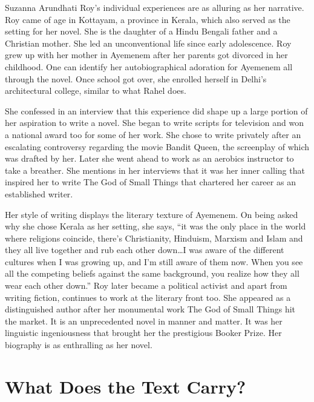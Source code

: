 Suzanna Arundhati Roy’s individual experiences are as alluring as her narrative. Roy came of age in Kottayam, a province in Kerala, which also served as the setting for her novel. She is the daughter of a Hindu Bengali father and a Christian mother. She led an unconventional life since early adolescence. Roy grew up with her mother in Ayemenem after her parents got divorced in her childhood. One can identify her autobiographical adoration for Ayemenem all through the novel. Once school got over, she enrolled herself in Delhi’s architectural college, similar to what Rahel does.

She confessed in an interview that this experience did shape up a large portion of her aspiration to write a novel. She began to write scripts for television and won a national award too for some of her work. She chose to write privately after an escalating controversy regarding the movie Bandit Queen, the screenplay of which was drafted by her. Later she went ahead to work as an aerobics instructor to take a breather. She mentions in her interviews that it was her inner calling that inspired her to write The God of Small Things that chartered her career as an established writer.

Her style of writing displays the literary texture of Ayemenem. On being asked why she chose Kerala as her setting, she says, ``it was the only place in the world where religions coincide, there's Christianity, Hinduism, Marxism and Islam and they all live together and rub each other down\ldots I was aware of the different cultures when I was growing up, and I'm still aware of them now. When you see all the competing beliefs against the same background, you realize how they all wear each other down.'' \parencite[36]{TalwarShashi}  Roy later became a political activist and apart from writing fiction, continues to work at the literary front too. She appeared as a distinguished author after her monumental work The God of Small Things hit the market. It is an unprecedented novel in manner and matter. It was her linguistic ingeniousness that brought her the prestigious Booker Prize. Her biography is as enthralling as her novel.

\section{What Does the Text Carry?}

